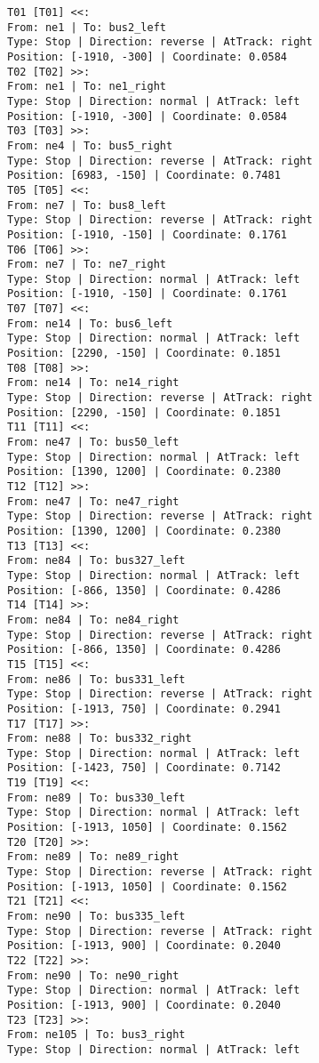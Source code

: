 	\begin{lstlisting}[language = {}, tabsize=4, basicstyle=\footnotesize\ttfamily, showspaces=false, showstringspaces=false, caption = Signalling.RNA, label = {lst:EJ3_6}]
T01 [T01] <<:
From: ne1 | To: bus2_left
Type: Stop | Direction: reverse | AtTrack: right 
Position: [-1910, -300] | Coordinate: 0.0584
T02 [T02] >>:
From: ne1 | To: ne1_right
Type: Stop | Direction: normal | AtTrack: left 
Position: [-1910, -300] | Coordinate: 0.0584
T03 [T03] >>:
From: ne4 | To: bus5_right
Type: Stop | Direction: reverse | AtTrack: right 
Position: [6983, -150] | Coordinate: 0.7481
T05 [T05] <<:
From: ne7 | To: bus8_left
Type: Stop | Direction: reverse | AtTrack: right 
Position: [-1910, -150] | Coordinate: 0.1761
T06 [T06] >>:
From: ne7 | To: ne7_right	
Type: Stop | Direction: normal | AtTrack: left 
Position: [-1910, -150] | Coordinate: 0.1761
T07 [T07] <<:
From: ne14 | To: bus6_left
Type: Stop | Direction: normal | AtTrack: left 
Position: [2290, -150] | Coordinate: 0.1851
T08 [T08] >>:
From: ne14 | To: ne14_right
Type: Stop | Direction: reverse | AtTrack: right 
Position: [2290, -150] | Coordinate: 0.1851
T11 [T11] <<:
From: ne47 | To: bus50_left
Type: Stop | Direction: normal | AtTrack: left 
Position: [1390, 1200] | Coordinate: 0.2380
T12 [T12] >>:
From: ne47 | To: ne47_right
Type: Stop | Direction: reverse | AtTrack: right 
Position: [1390, 1200] | Coordinate: 0.2380
T13 [T13] <<:
From: ne84 | To: bus327_left
Type: Stop | Direction: normal | AtTrack: left 
Position: [-866, 1350] | Coordinate: 0.4286
T14 [T14] >>:
From: ne84 | To: ne84_right
Type: Stop | Direction: reverse | AtTrack: right 
Position: [-866, 1350] | Coordinate: 0.4286
T15 [T15] <<:
From: ne86 | To: bus331_left
Type: Stop | Direction: reverse | AtTrack: right 
Position: [-1913, 750] | Coordinate: 0.2941
T17 [T17] >>:
From: ne88 | To: bus332_right
Type: Stop | Direction: normal | AtTrack: left 
Position: [-1423, 750] | Coordinate: 0.7142
T19 [T19] <<:
From: ne89 | To: bus330_left
Type: Stop | Direction: normal | AtTrack: left 
Position: [-1913, 1050] | Coordinate: 0.1562
T20 [T20] >>:
From: ne89 | To: ne89_right
Type: Stop | Direction: reverse | AtTrack: right 
Position: [-1913, 1050] | Coordinate: 0.1562
T21 [T21] <<:
From: ne90 | To: bus335_left
Type: Stop | Direction: reverse | AtTrack: right 
Position: [-1913, 900] | Coordinate: 0.2040
T22 [T22] >>:
From: ne90 | To: ne90_right
Type: Stop | Direction: normal | AtTrack: left 
Position: [-1913, 900] | Coordinate: 0.2040
T23 [T23] >>:
From: ne105 | To: bus3_right
Type: Stop | Direction: normal | AtTrack: left 

\end{lstlisting}
